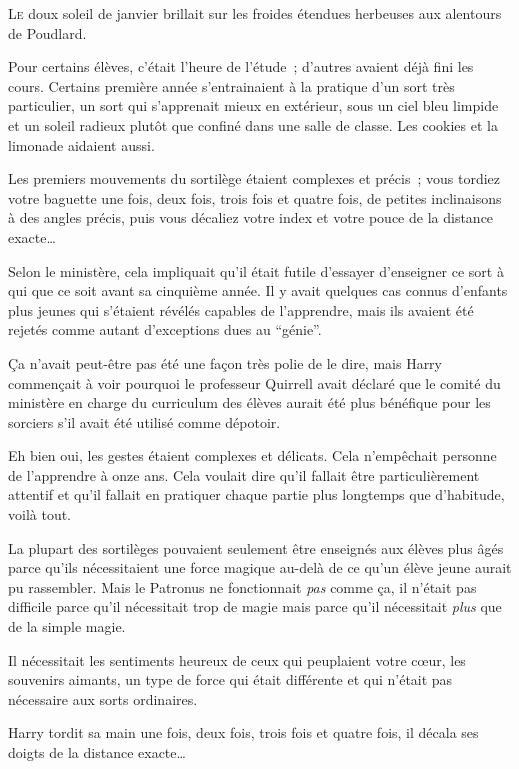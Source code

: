
\lettrine{L}{e} doux soleil de janvier brillait sur les froides étendues herbeuses aux alentours de Poudlard.

Pour certains élèves, c'était l'heure de l'étude~; d'autres avaient déjà fini les cours. Certains première année s'entrainaient à la pratique d'un sort très particulier, un sort qui s'apprenait mieux en extérieur, sous un ciel bleu limpide et un soleil radieux plutôt que confiné dans une salle de classe. Les cookies et la limonade aidaient aussi.

Les premiers mouvements du sortilège étaient complexes et précis~; vous tordiez votre baguette une fois, deux fois, trois fois et quatre fois, de petites inclinaisons à des angles précis, puis vous décaliez votre index et votre pouce de la distance exacte…

Selon le ministère, cela impliquait qu'il était futile d'essayer d'enseigner ce sort à qui que ce soit avant sa cinquième année. Il y avait quelques cas connus d'enfants plus jeunes qui s'étaient révélés capables de l'apprendre, mais ils avaient été rejetés comme autant d'exceptions dues au “génie”.

Ça n'avait peut-être pas été une façon très polie de le dire, mais Harry commençait à voir pourquoi le professeur Quirrell avait déclaré que le comité du ministère en charge du curriculum des élèves aurait été plus bénéfique pour les sorciers s'il avait été utilisé comme dépotoir.

Eh bien oui, les gestes étaient complexes et délicats. Cela n'empêchait personne de l'apprendre à onze ans. Cela voulait dire qu'il fallait être particulièrement attentif et qu'il fallait en pratiquer chaque partie plus longtemps que d'habitude, voilà tout.

La plupart des sortilèges pouvaient seulement être enseignés aux élèves plus âgés parce qu'ils nécessitaient une force magique au-delà de ce qu'un élève jeune aurait pu rassembler. Mais le Patronus ne fonctionnait \emph{pas} comme ça, il n'était pas difficile parce qu'il nécessitait trop de magie mais parce qu'il nécessitait \emph{plus} que de la simple magie.

Il nécessitait les sentiments heureux de ceux qui peuplaient votre cœur, les souvenirs aimants, un type de force qui était différente et qui n'était pas nécessaire aux sorts ordinaires.

Harry tordit sa main une fois, deux fois, trois fois et quatre fois, il décala ses doigts de la distance exacte…

